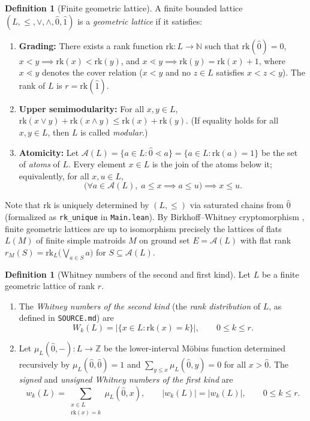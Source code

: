 \documentclass[11pt]{article}
\theoremstyle{definition}
\newtheorem{definition}[theorem]{Definition}
\theoremstyle{remark}
\newcommand{\rk}{\mathrm{rk}}
\newcommand{\Z}{\mathbb{Z}}
\begin{document}
\begin{definition}[Finite geometric lattice]
\label{def:geom-lattice}
A finite bounded lattice $(L, \le, \vee, \wedge, \hat{0}, \hat{1})$ is a \emph{geometric lattice}
if it satisfies:
\begin{enumerate}
  \item[(1)] \textbf{Grading:} There exists a rank function $\rk : L \to \mathbb{N}$ such that
    $\rk(\hat{0}) = 0$, $x < y \implies \rk(x) < \rk(y)$, and $x \lessdot y \implies
    \rk(y) = \rk(x) + 1$, where $x \lessdot y$ denotes the cover relation ($x < y$ and no $z \in L$
    satisfies $x < z < y$). The rank of $L$ is $r = \rk(\hat{1})$.
  \item[(2)] \textbf{Upper semimodularity:} For all $x, y \in L$,
    $\rk(x \vee y) + \rk(x \wedge y) \le \rk(x) + \rk(y)$.
    (If equality holds for all $x, y \in L$, then $L$ is called \emph{modular}.)
  \item[(3)] \textbf{Atomicity:} Let $\mathcal{A}(L) = \{a \in L : \hat{0} \lessdot a\} = \{a \in L :
    \rk(a) = 1\}$ be the set of \emph{atoms} of $L$. Every element $x \in L$ is the join of the
    atoms below it; equivalently, for all $x, u \in L$,
    \[
      \bigl(\forall a \in \mathcal{A}(L),\; a \le x \implies a \le u\bigr) \implies x \le u.
    \]
\end{enumerate}
\end{definition}

Note that $\rk$ is uniquely determined by $(L, \le)$ via saturated chains from $\hat{0}$
(formalized as \texttt{rk\_unique} in \texttt{Main.lean}). By Birkhoff--Whitney cryptomorphism
\cite{Oxley2011,White1986}, finite geometric lattices are up to isomorphism precisely the lattices
of flats $L(M)$ of finite simple matroids $M$ on ground set $E = \mathcal{A}(L)$ with flat rank
$r_M(S) = \rk_L\bigl(\bigvee_{a \in S} a\bigr)$ for $S \subseteq \mathcal{A}(L)$.

\begin{definition}[Whitney numbers of the second and first kind]
\label{def:whitney}
Let $L$ be a finite geometric lattice of rank $r$.
\begin{enumerate}
  \item[(1)] The \emph{Whitney numbers of the second kind} (the \emph{rank distribution} of $L$, as
    defined in \texttt{SOURCE.md}) are
    \[
      W_k(L) = \bigl|\{x \in L : \rk(x) = k\}\bigr|, \qquad 0 \le k \le r.
    \]
  \item[(2)] Let $\mu_L(\hat{0}, -): L \to \Z$ be the lower-interval M\"obius function determined
    recursively by $\mu_L(\hat{0}, \hat{0}) = 1$ and $\sum_{y \le x} \mu_L(\hat{0}, y) = 0$ for
    all $x > \hat{0}$. The \emph{signed} and \emph{unsigned Whitney numbers of the first kind} are
    \[
      w_k(L) = \sum_{\substack{x \in L \\ \rk(x) = k}} \mu_L(\hat{0}, x), \qquad
      |w_k(L)| = \bigl|w_k(L)\bigr|, \qquad 0 \le k \le r.
    \]
\end{enumerate}
\end{definition}
\end{document}
